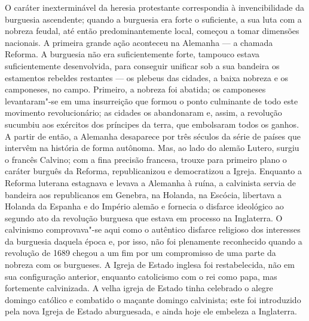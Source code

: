 O caráter inexterminável da heresia protestante correspondia à
invencibilidade da burguesia ascendente; quando a burguesia era forte o
suficiente, a sua luta com a nobreza feudal, até então predominantemente local, começou a tomar dimensões nacionais. A primeira grande ação
aconteceu na Alemanha --- a chamada Reforma. A burguesia não era
suficientemente forte, tampouco estava suficientemente desenvolvida,
para conseguir unificar sob a sua bandeira os estamentos rebeldes
restantes --- os plebeus das cidades, a baixa nobreza e os camponeses, no %
campo. Primeiro, a nobreza foi abatida; os camponeses levantaram"-se em
uma insurreição que formou o ponto culminante de todo este movimento
revolucionário; as cidades os abandonaram e, assim, a revolução sucumbiu
aos exércitos dos príncipes da terra, que embolsaram todos os ganhos. A
partir de então, a Alemanha desaparece por três séculos da série de
países que intervêm na história de forma autônoma. Mas, ao lado do
alemão Lutero, surgiu o
francês Calvino;
com a fina precisão francesa, trouxe para primeiro plano o caráter
burguês da Reforma, republicanizou e democratizou a Igreja. Enquanto a
Reforma luterana estagnava e levava a Alemanha à ruína, a calvinista
servia de bandeira aos republicanos em Genebra, na Holanda, na Escócia,
libertava a Holanda da Espanha e do Império alemão e fornecia o
disfarce ideológico ao segundo ato da revolução burguesa que estava em
processo na Inglaterra. O calvinismo comprovava"-se aqui como o autêntico
disfarce religioso dos interesses da burguesia daquela época e, por
isso, não foi plenamente reconhecido quando a revolução de 1689 chegou a
um fim por um compromisso de uma parte da nobreza com os burgueses. A Igreja de Estado
inglesa foi restabelecida, não em sua configuração anterior, enquanto
catolicismo com o rei como papa, mas fortemente calvinizada. A velha
igreja de Estado tinha celebrado o alegre domingo católico e combatido o
maçante domingo calvinista; este foi introduzido pela nova Igreja de
Estado aburguesada, e ainda hoje ele embeleza a Inglaterra.

